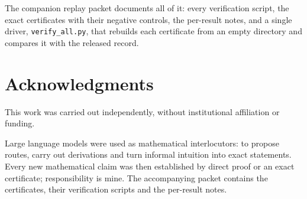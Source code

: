 \documentclass[11pt,a4paper]{article}
\theoremstyle{plain}
\theoremstyle{definition}
\theoremstyle{remark}
\begin{document}
The companion replay packet documents all of it: every verification script,
the exact certificates with their negative controls, the per-result notes,
and a single driver, \texttt{verify\_all.py}, that rebuilds each certificate
from an empty directory and compares it with the released record.

\section*{Acknowledgments}

This work was carried out independently, without institutional affiliation or
funding.

Large language models were used as mathematical interlocutors: to propose
routes, carry out derivations and turn informal intuition into exact statements.
Every new mathematical claim was then established by direct proof or an exact
certificate; responsibility is mine. The accompanying packet contains the
certificates, their verification scripts and the per-result notes.
\end{document}
